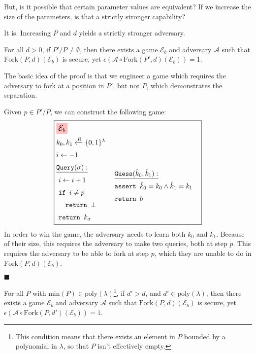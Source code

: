 But, is it possible that certain parameter values are equivalent?
If we increase the size of the parameters, is that a strictly stronger
capability?

It is.
Increasing $P$ and $d$ yields a strictly stronger adversary.

\begin{claim}
    \label{claim:P-is-stronger}
    For all $d > 0$, if $P' / P \neq \emptyset$, then there exists a
    game $\mathcal{E}_b$ and adversary $\mathcal{A}$ such that 
    $\text{Fork}(P, d)(\mathcal{E}_b)$ is secure, yet $\epsilon(\mathcal{A} \circ \text{Fork}(P', d)(\mathcal{E}_b)) = 1$.
\end{claim}

The basic idea of the proof is that we engineer a game which requires
the adversary to fork at a position in $P'$, but not $P$, which demonstrates
the separation.

Given $p \in P' / P$, we can construct the following game:
$$
\boxed{
\begin{aligned}
&\colorbox{pink}{\large $\mathcal{E}_b$}\cr
&k_0, k_1 \xleftarrow{R} \{0, 1\}^\lambda\cr
&i \gets -1\cr
&\begin{aligned}
    &\underline{\texttt{Query}(\sigma):}\cr
    &\ i \gets i + 1\cr
    &\ \texttt{if } i \neq p\cr
    &\ \quad \texttt{return } \bot\cr
    &\ \texttt{return } k_\sigma\cr
\end{aligned}
&\begin{aligned}
    &\ \underline{\texttt{Guess}(\hat{k}_0, \hat{k}_1):}\cr
    &\ \texttt{assert } \hat{k}_0 = k_0 \land \hat{k}_1 = k_1\cr
    &\ \texttt{return } b\cr
    &\cr
\end{aligned}\cr
\end{aligned}
}
$$
In order to win the game, the adversary needs to learn both $k_0$
and $k_1$.
Because of their size, this requires the adversary to make two
queries, both at step $p$.
This requires the adversary to be able to fork at step $p$,
which they are unable to do in $\text{Fork}(P, d)(\mathcal{E}_b)$.

$\blacksquare$

\begin{claim}
    \label{claim:P-is-stronger}
    For all $P$ with $\text{min}(P) \in \text{poly}(\lambda)$\footnote{This condition means that there exists an element in $P$ bounded by a polynomial in $\lambda$, so that $P$ isn't effectively empty.},
    if $d' > d$, and ${d' \in \text{poly}(\lambda)}$, then there exists a
    game $\mathcal{E}_b$ and adversary $\mathcal{A}$ such that 
    $\text{Fork}(P, d)(\mathcal{E}_b)$ is secure, yet ${\epsilon(\mathcal{A} \circ \text{Fork}(P, d')(\mathcal{E}_b)) = 1}$.
\end{claim}

